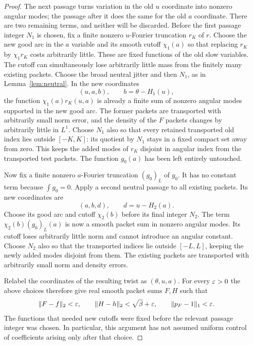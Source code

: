 \begin{proof}
The next passage turns variation in the old $u$ coordinate into
nonzero angular modes; the passage after it does the same for the old
$a$ coordinate. There are two remaining terms, and neither will be
discarded. Before
the first passage integer $N_1$ is chosen, fix a finite nonzero
$u$-Fourier truncation $r_K$ of $r$.  Choose the new good arc in the
$a$ variable and its smooth cutoff $\chi_1(a)$ so that replacing $r_K$
by $\chi_1r_K$ costs arbitrarily little.  These are fixed functions of
the old slow variables.  The cutoff can simultaneously lose arbitrarily
little mass from the finitely many existing packets.  Choose the broad
neutral jitter and then $N_1$, as in Lemma~\ref{lem:neutral}.  In the new
coordinates
\[
 (u,a,b),\qquad b=\theta-H_1(u),
\]
the function $\chi_1(a)r_K(u,a)$ is already a finite sum of nonzero
angular modes supported in the new good arc.  The former packets are
transported with arbitrarily small norm error, and the density of the
$F$ packets changes by arbitrarily little in $L^1$.  Choose $N_1$ also so that every retained transported old index lies
outside $[-K,K]$: its quotient by $N_1$ stays in a fixed compact set
away from zero. This keeps the added modes of $r_K$ disjoint in angular
index from the transported test packets.  The function $g_0(a)$ has been left entirely untouched.

Now fix a finite nonzero $a$-Fourier truncation $(g_0)_L$ of $g_0$.
It has no constant term because $\int g_0=0$.  Apply a second neutral
passage to all existing packets.  Its new coordinates are
\[
 (a,b,d),\qquad d=u-H_2(a).
\]
Choose its good arc and cutoff $\chi_2(b)$ before its final integer
$N_2$.  The term $\chi_2(b)(g_0)_L(a)$ is now a smooth packet sum in
nonzero angular modes.  Its cutoff loses arbitrarily little norm and
cannot introduce an angular constant.  Choose $N_2$ also so that the transported indices lie outside
$[-L,L]$, keeping the newly added modes disjoint from them.  The existing packets are
transported with arbitrarily small norm and density errors.

Relabel the coordinates of the resulting twist as $(\theta,u,a)$.
For every $\varepsilon>0$ the above choices therefore give real smooth packet
sums $F,H$ such that
\begin{equation}\label{eq:prepared-pair}
 \|F-f\|_2<\varepsilon,\qquad
 \|H-h\|_2<\sqrt\beta+\varepsilon,\qquad
 \|p_F-1\|_1<\varepsilon.
\end{equation}
The functions that needed new cutoffs were fixed before the relevant
passage integer was chosen.  In particular, this argument has not
assumed uniform control of coefficients arising only after that choice.


\end{proof}

